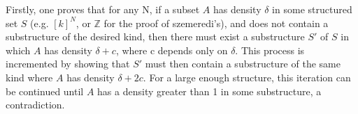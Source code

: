 \documentclass[11pt,a4paper]{article}
\begin{document}
Firstly, one proves that for any N, if a subset $A$ has density $\delta$ in some structured set $S$ (e.g. $[k]^N$, or $\mathbb{Z}$ for the proof of szemeredi's), and does not contain a substructure of the desired kind, then there must exist a substructure $S'$ of $S$ in which $A$ has density $\delta + c$, where c depends only on $\delta$. This process is incremented by showing that $S'$ must then contain a substructure of the same kind where $A$ has density $\delta + 2c$. For a large enough structure, this iteration can be continued until $A$ has a density greater than 1 in some substructure, a contradiction.
\end{document}

